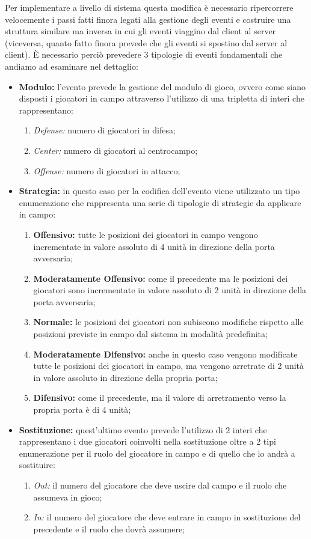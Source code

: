 \documentclass[aps,letterpaper,10pt]{article}
\begin{document}
Per implementare a livello di sistema questa modifica \`e necessario ripercorrere velocemente i passi fatti finora legati alla gestione degli eventi e costruire una struttura similare ma inversa in cui gli eventi viaggino dal client al server (viceversa, quanto fatto finora prevede che gli eventi si spostino dal server al client). \`E necessario perci\`o prevedere 3 tipologie di eventi fondamentali che andiamo ad esaminare nel dettaglio:

\begin{itemize}
	\item \textbf{Modulo:} l'evento prevede la gestione del modulo di gioco, ovvero come siano disposti i giocatori in campo attraverso l'utilizzo di una tripletta di interi che rappresentano:
	\begin{enumerate}
		\item \emph{Defense:} numero di giocatori in difesa;
		\item \emph{Center:} numero di giocatori al centrocampo;
		\item \emph{Offense:} numero di giocatori in attacco;
	\end{enumerate}
	\item \textbf{Strategia:} in questo caso per la codifica dell'evento viene utilizzato un tipo enumerazione che rappresenta una serie di tipologie di strategie da applicare in campo:
	\begin{enumerate}
		\item \textbf{Offensivo:} tutte le posizioni dei giocatori in campo vengono incrementate in valore assoluto di 4 unit\`a in direzione della porta avversaria;
		\item \textbf{Moderatamente Offensivo:} come il precedente ma le posizioni dei giocatori sono incrementate in valore assoluto di 2 unit\`a in direzione della porta avversaria;
		\item \textbf{Normale:} le posizioni dei giocatori non subiscono modifiche rispetto alle posizioni previste in campo dal sistema in modalit\`a predefinita;
		\item \textbf{Moderatamente Difensivo:} anche in questo caso vengono modificate tutte le posizioni dei giocatori in campo, ma vengono arretrate di 2 unit\`a in valore assoluto in direzione della propria porta;
		\item \textbf{Difensivo:} come il precedente, ma il valore di arretramento verso la propria porta \`e di 4 unit\`a;
	\end{enumerate}
	\item \textbf{Sostituzione:} quest'ultimo evento prevede l'utilizzo di 2 interi che rappresentano i due giocatori coinvolti nella sostituzione oltre a 2 tipi enumerazione per il ruolo del giocatore in campo e di quello che lo andr\`a a sostituire:
	\begin{enumerate}
		\item \emph{Out:} il numero del giocatore che deve uscire dal campo e il ruolo che assumeva in gioco;
		\item \emph{In:} il numero del giocatore che deve entrare in campo in sostituzione del precedente e il ruolo che dovr\`a assumere;
	\end{enumerate}
\end{itemize}
\end{document}
